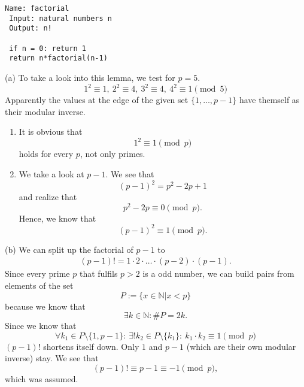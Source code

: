 \documentclass[12pt]{article}
\begin{document}
 \begin{lstlisting}[caption={Algorithm to compute factorial of a given number},label={algo:2}]
 Name: factorial
 Input: natural numbers n
 Output: n!
 
 if n = 0: return 1
 return n*factorial(n-1)
 \end{lstlisting} 
 
 (a) To take a look into this lemma, we test for $p=5$. \begin{equation}
 	1^2\equiv 1,\ 2^2\equiv 4,\ 3^2\equiv 4,\ 4^2\equiv 1 \pmod{5}
 \end{equation}
 Apparently the values at the edge of the given set $\{1, \ldots, p-1\}$ have themself as their modular inverse. \begin{enumerate}
 	\item It is obvious that \begin{equation}
 		1^2 \equiv 1 \pmod{p}
 	\end{equation} holds for every $p$, not only primes.
 	\item We take a look at $p-1$. We see that \begin{equation}
 		(p-1)^2=p^2-2p+1
 	\end{equation} and realize that \begin{equation}
 		p^2-2p \equiv 0 \pmod{p}.
 	\end{equation} Hence, we know that \begin{equation}
 		(p-1)^2 \equiv 1 \pmod{p}.
 	\end{equation}
 \end{enumerate}

 (b) We can split up the factorial of $p-1$ to \begin{gather}
 	(p-1)!=1\cdot 2\cdot\ldots\cdot (p-2)\cdot (p-1).
 \end{gather} Since every prime $p$ that fulfils $p>2$ is a odd number, we can build pairs from elements of the set \begin{equation}
 	P := \{x\in\mathbb{N}| x<p\}
 \end{equation} because we know that \begin{equation}
 	\exists k\in\mathbb{N}: \# P=2k.
 \end{equation} Since we know that \begin{equation}
 	\forall k_1\in P\setminus\{1,p-1\}:\ \exists! k_2\in P\setminus\{k_1\}:\ k_1\cdot k_2 \equiv 1 \pmod{p}
 \end{equation} $(p-1)!$ shortens itself down. Only $1$ and $p-1$ (which are their own modular inverse) stay. We see that \begin{equation}
 	(p-1)!\equiv p-1 \equiv -1 \pmod{p},
 \end{equation} which was assumed.
 
\end{document}
